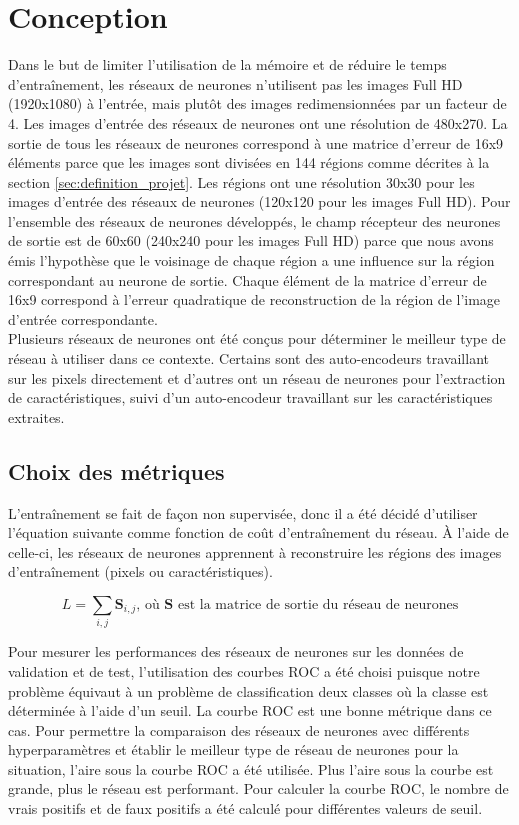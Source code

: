 \section{Conception}
    Dans le but de limiter l'utilisation de la mémoire et de réduire le temps d'entraînement, les réseaux de neurones n'utilisent pas les images Full HD (1920x1080) à l'entrée, mais plutôt des images redimensionnées par un facteur de 4. Les images d'entrée des réseaux de neurones ont une résolution de 480x270. La sortie de tous les réseaux de neurones correspond à une matrice d'erreur de 16x9 éléments parce que les images sont divisées en 144 régions comme décrites à la section \ref{sec:definition_projet}. Les régions ont une résolution 30x30 pour les images d'entrée des réseaux de neurones (120x120 pour les images Full HD). Pour l'ensemble des réseaux de neurones développés, le champ récepteur des neurones de sortie est de 60x60 (240x240 pour les images Full HD) parce que nous avons émis l'hypothèse que le voisinage de chaque région a une influence sur la région correspondant au neurone de sortie. Chaque élément de la matrice d'erreur de 16x9 correspond à l'erreur quadratique de reconstruction de la région de l'image d'entrée correspondante.\\
    
    Plusieurs réseaux de neurones ont été conçus pour déterminer le meilleur type de réseau à utiliser dans ce contexte. Certains sont des auto-encodeurs travaillant sur les pixels directement et d'autres ont un réseau de neurones pour l'extraction de caractéristiques, suivi d'un auto-encodeur travaillant sur les caractéristiques extraites. 

\subsection{Choix des métriques}
    L'entraînement se fait de façon non supervisée, donc il a été décidé d'utiliser l'équation suivante comme fonction de coût d'entraînement du réseau. À l'aide de celle-ci, les réseaux de neurones apprennent à reconstruire les régions des images d'entraînement (pixels ou caractéristiques).
    
    \begin{equation}
        L = \sum_{i,j} \mathbf{S}_{i,j} \text{, où } \mathbf{S} \text{ est la matrice de sortie du réseau de neurones}
    \end{equation}
    
    Pour mesurer les performances des réseaux de neurones sur les données de validation et de test, l'utilisation des courbes ROC a été choisi puisque notre problème équivaut à un problème de classification deux classes où la classe est déterminée à l'aide d'un seuil. La courbe ROC est une bonne métrique dans ce cas. Pour permettre la comparaison des réseaux de neurones avec différents hyperparamètres et établir le meilleur type de réseau de neurones pour la situation, l'aire sous la courbe ROC a été utilisée. Plus l'aire sous la courbe est grande, plus le réseau est performant. Pour calculer la courbe ROC, le nombre de vrais positifs et de faux positifs a été calculé pour différentes valeurs de seuil.

